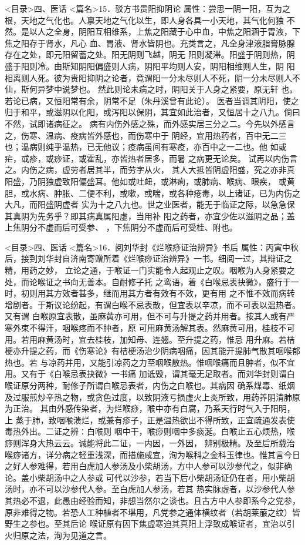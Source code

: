 \documentclass[a4paper,12pt,UTF8,twoside]{ctexbook}
\begin{document}
<目录>四、医话
<篇名>15．驳方书贵阳抑阴论
属性：尝思一阴一阳，互为之根，天地之气化也。人禀天地之气化以生，即人身各具一小天地，其气化何独 
不然。是以人之全身，阴阳互相维系，上焦之阳藏于心中血，中焦之阳涵于胃液，下焦之阳存于肾水，凡心 
血、胃液、肾水皆阴也。充类言之，凡全身津液脂膏脉腺存在之处，即元阳留蓄之处。阳无阴则飞越，阴无 
阳则凝滞。阳盛于阴则热，阴盛于阳则冷。由斯知阴阳偏盛则人病，阴阳平均则人安，阴阳相维则人生，阴 
阳相离则人死。彼为贵阳抑阴之论者，竟谓阳一分未尽则人不死，阴一分未尽则人不仙，斯何异梦中说梦也。 
然此则论未病之时，阴阳关于人身之紧要，原无轩 也。若论已病，又恒阳常有余，阴常不足（朱丹溪曾有此论）。 
医者当调其阴阳，使之归于和平，或滋阴以化阳，或泻阳以保阴，其宜如此治者，又恒居十之八九。倘曰 
不然，试即诸病征之。 
病有内伤外感之殊，而外感实居三分之二。今先以外感言之，伤寒、温病、疫病皆外感也，而伤寒中于 
阴经，宜用热药者，百中无二三也；温病则纯乎温热，已无他议；疫病虽间有寒疫，亦百中之一二也。他 
如或疟，或疹，或痧证，或霍乱，亦皆热者居多，而暑 之病更无论矣。 
试再以内伤言之。内伤之病，虚劳者居其半，而劳字从火， 
其人大抵皆阴虚阳盛，究之亦非真阳盛，乃阴独虚致阳偏盛耳。他如或吐衄，或淋痢，或肺病、喉病、眼疾， 
或黄胆，或水病、肿胀、二便不利，或嗽，或喘，或各种疮毒，以上诸证，已为内伤之大凡，而阳盛阴虚者 
实为十之八九也。世之业医者，能无于临证之际，以急急保其真阴为先务乎？即其病真属阳虚，当用补 
阳之药者，亦宜少佐以滋阴之品；盖上焦阴分不虚而后可受参、 ，下焦阴分不虚而后可受桂、附也。 

<目录>四、医话
<篇名>16．阅刘华封《烂喉痧证治辨异》书后
属性：丙寅中秋后，接到刘华封自济南寄赠所着《烂喉痧证治辨异》一书。细阅一过，其辩证之精，用药之妙， 
立论之通，于喉证一门实能令人起观止之叹。咽喉为人身紧要之处，而论喉证之书向无善本。自耐修子托 
之鸾语，着《白喉忌表抉微》，盛行于一时，初则用其方效者甚多，继而用其方者有效有不效，更有用 
之不惟不效而病转增剧者。于斯议论纷起，有谓白喉不忌表散，但宜表以辛凉，而不可表以温热者。又有谓 
白喉原宜表散，虽麻黄亦可用，但不可与升提之药并用者。按其人或有严寒外束不得汗，咽喉疼而不肿者，原 
可用麻黄汤解其表。然麻黄可用，桂枝不可用。若用麻黄汤时，宜去桂枝，加知母、连翘。至升提之药，惟忌 
用升麻。若桔梗亦升提之药，而《伤寒论》有桔梗汤治少阴病咽痛，因其能开提肺气散其咽喉郁热也。若 
与凉药并用，又能引凉药之力至咽喉散热。惟咽喉痛而且肿者，似不宜用。又有于《白喉忌表抉微》一书痛 
加诋毁，谓其毫无足取者。而刘华封则谓白喉证原分两种，耐修子所谓白喉忌表者，内伤之白喉也。其病因 
确系煤毒、纸烟及过服煎炒辛热之物，或贪色过度，以致阴液亏损虚火上炎所致，用药养阴清肺原为正治。 
其由外感传染者，为烂喉痧，喉中亦有白腐，乃系天行时气入于阳明，上 
蒸于肺，致咽喉溃烂，或兼有疹子，正是温热欲出不得所致，正宜疏通发表使毒热外出。二证之辨∶白喉则 
咽中干，喉痧则咽中多痰涎。白喉止五心烦热，喉痧则浑身大热云云。诚能将此二证，一内因，一外因， 
辨别极精。及至后所载治喉痧诸方，详分病之轻重浅深，而措施咸宜，洵为喉科之金科玉律也。惟其言今日 
之好人参难得，若用白虎加人参汤及小柴胡汤，方中人参可以沙参代之，似非确论。盖小柴胡汤中之人参或 
可代以沙参，若当下后小柴胡汤证仍在者，用小柴胡汤时，亦不可以沙参代人参。至白虎加人参汤，若其 
热实脉虚者，以沙参代人参其热必不退，此愚由经验而知，非想当然尔之谈也。且古方中人参即系今之党参， 
原非难得之物。若恐人工种植者不堪用，凡党参之通体横纹者（若胡莱菔之纹）皆野生之参也。至其后论 
喉证原有因下焦虚寒迫其真阳上浮致成喉证者，宜治以引火归原之法，洵为见道之言。 
\end{document}
